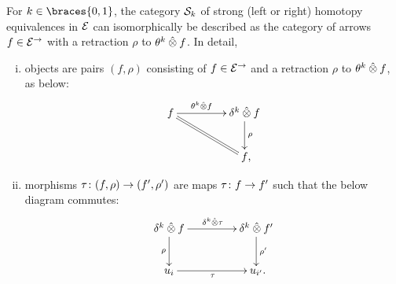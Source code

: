 \documentclass[reqno,10pt,a4paper,oneside,draft]{amsart}
\begin{document}
\begin{lemma} \label{strong-h-equiv-as-section}
For $k \in \braces{0, 1}$, the category $\cal{S}_k$ of strong (left or right) homotopy equivalences in $\catE$ can isomorphically be described as the category of arrows $f \in \catE^{\to}$ with a retraction $\rho$ to $\thetak \hatotimes f$.
In detail,
\begin{enumerate}[(i)]
\item objects are pairs $(f, \rho)$ consisting of $f \in \catE^\to$ and a retraction $\rho$ to $\thetak \hatotimes f$, as below:
\[
\xymatrix@C+2em{
  f
  \ar[r]^-{\thetak \hatotimes f}
  \ar@{=}[dr]
&
  \kcyl \hatotimes f \ar[d]^{\rho}
\\&
  f
\rlap{,}}
\]
\item morphisms $\tau \co (f, \rho) \to (f', \rho')$ are maps $\tau \co f \to f'$ such that the below diagram commutes:
\[
\xymatrix@C+2em{
  \kcyl \hatotimes f
  \ar[d]_-{\rho}
  \ar[r]^{\kcyl \hatotimes \tau}
&
 \kcyl \hatotimes f'
  \ar[d]^-{\rho'}
\\
  u_i
  \ar[r]_{\tau}
&
  u_{i'} \rlap{.}
}
\]
\end{enumerate}
\end{lemma}
\end{document}
